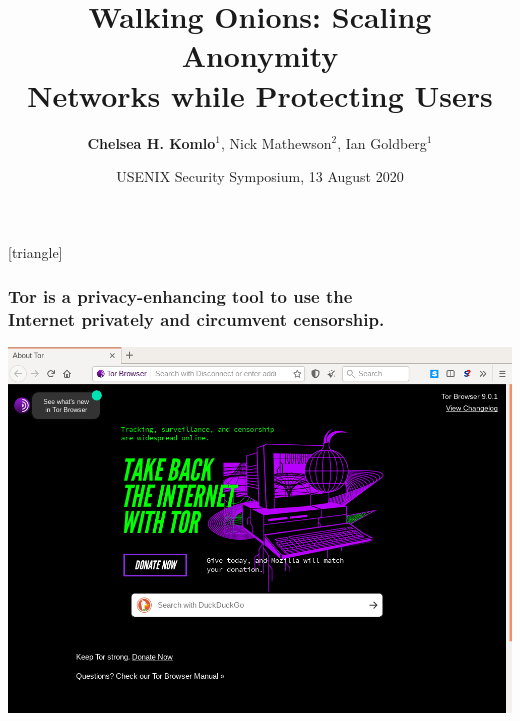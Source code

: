\documentclass[hyperref={pdfpagelabels=true},table,dvipsnames,14pt,aspectratio=169]{beamer}
\title[Walking Onions]{Walking Onions: Scaling Anonymity \\ Networks while Protecting Users}
\author[Chelsea Komlo, Nick Mathewson, Ian Goldberg]{\textbf{Chelsea H. Komlo}$^1$, Nick Mathewson$^2$, Ian Goldberg$^1$}
\institute[]{\small $^1$ University of Waterloo\hspace{4em}$^2$ The Tor Project}
\date[13 August 2020]{USENIX Security Symposium, 13 August 2020}
\begin{document}
[triangle]

\begin{frame}
        \thispagestyle{empty}
        \maketitle
\end{frame}

\begin{frame}
\frametitle{Tor is a privacy-enhancing tool to use the \\ Internet privately and
  circumvent censorship.}
  \centering
  \scalebox{0.30} {
    \includegraphics{torbrowser.png}
  }
\end{frame}
\end{document}
